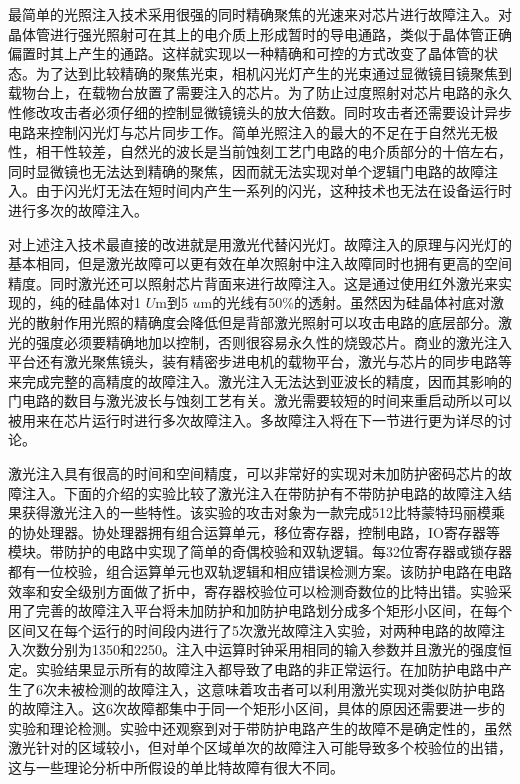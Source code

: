 \documentclass[a4paper,12pt]{article}
\begin{document}
\begin{CJK}{UTF8}{gkai}
最简单的光照注入技术采用很强的同时精确聚焦的光速来对芯片进行故障注入。对晶体管进行强光照射可在其上的电介质上形成暂时的导电通路，类似于晶体管正确偏置时其上产生的通路。这样就实现以一种精确和可控的方式改变了晶体管的状态。为了达到比较精确的聚焦光束，相机闪光灯产生的光束通过显微镜目镜聚焦到载物台上，在载物台放置了需要注入的芯片。为了防止过度照射对芯片电路的永久性修改攻击者必须仔细的控制显微镜镜头的放大倍数。同时攻击者还需要设计异步电路来控制闪光灯与芯片同步工作。简单光照注入的最大的不足在于自然光无极性，相干性较差，自然光的波长是当前蚀刻工艺门电路的电介质部分的十倍左右，同时显微镜也无法达到精确的聚焦，因而就无法实现对单个逻辑门电路的故障注入。由于闪光灯无法在短时间内产生一系列的闪光，这种技术也无法在设备运行时进行多次的故障注入。

对上述注入技术最直接的改进就是用激光代替闪光灯。故障注入的原理与闪光灯的基本相同，但是激光故障可以更有效在单次照射中注入故障同时也拥有更高的空间精度。同时激光还可以照射芯片背面来进行故障注入。这是通过使用红外激光来实现的，纯的硅晶体对1 $U$m到5 $u$m的光线有50\%的透射。虽然因为硅晶体衬底对激光的散射作用光照的精确度会降低但是背部激光照射可以攻击电路的底层部分。激光的强度必须要精确地加以控制，否则很容易永久性的烧毁芯片。商业的激光注入平台还有激光聚焦镜头，装有精密步进电机的载物平台，激光与芯片的同步电路等来完成完整的高精度的故障注入。激光注入无法达到亚波长的精度，因而其影响的门电路的数目与激光波长与蚀刻工艺有关。激光需要较短的时间来重启动所以可以被用来在芯片运行时进行多次故障注入。多故障注入将在下一节进行更为详尽的讨论。

激光注入具有很高的时间和空间精度，可以非常好的实现对未加防护密码芯片的故障注入。下面的介绍的实验比较了激光注入在带防护有不带防护电路的故障注入结果获得激光注入的一些特性。该实验的攻击对象为一款完成512比特蒙特玛丽模乘的协处理器。协处理器拥有组合运算单元，移位寄存器，控制电路，IO寄存器等模块。带防护的电路中实现了简单的奇偶校验和双轨逻辑。每32位寄存器或锁存器都有一位校验，组合运算单元也双轨逻辑和相应错误检测方案。该防护电路在电路效率和安全级别方面做了折中，寄存器校验位可以检测奇数位的比特出错。实验采用了完善的故障注入平台将未加防护和加防护电路划分成多个矩形小区间，在每个区间又在每个运行的时间段内进行了5次激光故障注入实验，对两种电路的故障注入次数分别为1350和2250。注入中运算时钟采用相同的输入参数并且激光的强度恒定。实验结果显示所有的故障注入都导致了电路的非正常运行。在加防护电路中产生了6次未被检测的故障注入，这意味着攻击者可以利用激光实现对类似防护电路的故障注入。这6次故障都集中于同一个矩形小区间，具体的原因还需要进一步的实验和理论检测。实验中还观察到对于带防护电路产生的故障不是确定性的，虽然激光针对的区域较小，但对单个区域单次的故障注入可能导致多个校验位的出错，这与一些理论分析中所假设的单比特故障有很大不同。


\end{CJK}
\end{document}
